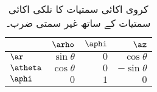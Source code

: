 \\
\begin{table}
\caption*{کروی  اکائی سمتیات کا نلکی اکائی سمتیات کے ساتھ غیر سمتی ضرب۔}
\centering
\begin{tabular}{l | r r r}
 & $\arho$ & $\aphi$ & $\az$ \\
\hline
$\ar$ & $\sin \theta$ & $0$& $\cos \theta$\\
$\atheta$ &$\cos \theta$ &$ 0$ &$ -\sin \theta$\\
$\aphi$ & $0$ &$ 1$ &$0$
\end{tabular}
\end{table}

